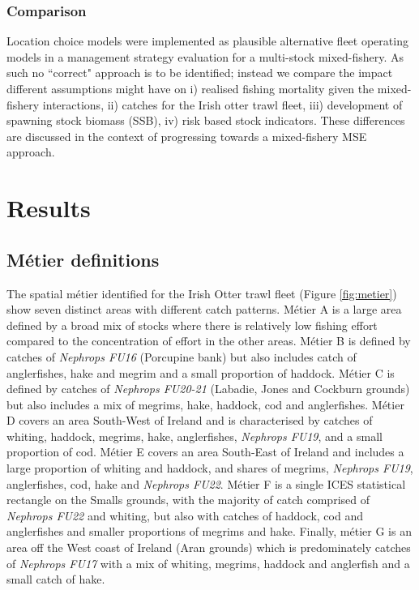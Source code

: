 \documentclass[12pt, halfline, a4paper]{ouparticle}
\begin{document}
\subsubsection{Comparison}

Location choice models were implemented as plausible alternative fleet
operating models in a management strategy evaluation for a multi-stock
mixed-fishery. As such no ``correct" approach is to be identified; instead we
compare the impact different assumptions might have on i) realised fishing
mortality given the mixed-fishery interactions, ii) catches for the Irish otter
trawl fleet, iii) development of spawning stock biomass (SSB), iv) risk based
stock indicators. These differences are discussed in the context of progressing
towards a mixed-fishery MSE approach.

\section{Results}
\label{res}

\subsection{Métier definitions}

The spatial métier identified for the Irish Otter trawl fleet (Figure
\ref{fig:metier}) show seven distinct areas with different catch patterns.
Métier A is a large area defined by a broad mix of stocks where there is
relatively low fishing effort compared to the concentration of effort in the
other areas. Métier B is defined by catches of \textit{Nephrops FU16}
(Porcupine bank) but also includes catch of anglerfishes, hake and megrim and a
small proportion of haddock. Métier C is defined by catches of \textit{Nephrops
	FU20-21} (Labadie, Jones and Cockburn grounds) but also includes a mix
of megrims, hake, haddock, cod and anglerfishes. Métier D covers an area
South-West of Ireland and is characterised by catches of whiting, haddock,
megrims, hake, anglerfishes, \textit{Nephrops FU19}, and a small proportion of
cod. Métier E covers an area South-East of Ireland and includes a large
proportion of whiting and haddock, and shares of megrims, \textit{Nephrops
	FU19}, anglerfishes, cod, hake and \textit{Nephrops FU22}.  Métier F is
a single ICES statistical rectangle on the Smalls grounds, with the majority of catch comprised of
\textit{Nephrops FU22} and whiting, but also with catches of haddock, cod and
anglerfishes and smaller proportions of megrims and hake. Finally, métier G is
an area off the West coast of Ireland (Aran grounds) which is predominately
catches of \textit{Nephrops FU17} with a mix of whiting, megrims, haddock and
anglerfish and a small catch of hake.\\
\end{document}

